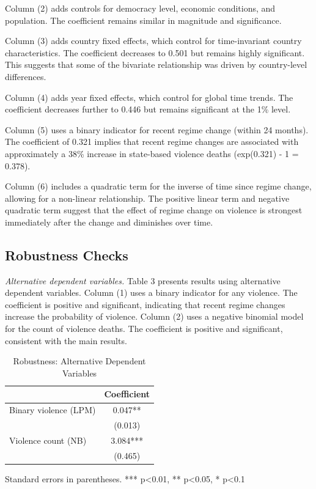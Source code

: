 \documentclass[12pt]{article}
\begin{document}
Column (2) adds controls for democracy level, economic conditions, and population. The coefficient remains similar in magnitude and significance.

Column (3) adds country fixed effects, which control for time-invariant country characteristics. The coefficient decreases to 0.501 but remains highly significant. This suggests that some of the bivariate relationship was driven by country-level differences.

Column (4) adds year fixed effects, which control for global time trends. The coefficient decreases further to 0.446 but remains significant at the 1\% level.

Column (5) uses a binary indicator for recent regime change (within 24 months). The coefficient of 0.321 implies that recent regime changes are associated with approximately a 38\% increase in state-based violence deaths (exp(0.321) - 1 = 0.378).

Column (6) includes a quadratic term for the inverse of time since regime change, allowing for a non-linear relationship. The positive linear term and negative quadratic term suggest that the effect of regime change on violence is strongest immediately after the change and diminishes over time.

\subsection{Robustness Checks}

\textit{Alternative dependent variables.} Table 3 presents results using alternative dependent variables. Column (1) uses a binary indicator for any violence. The coefficient is positive and significant, indicating that recent regime changes increase the probability of violence. Column (2) uses a negative binomial model for the count of violence deaths. The coefficient is positive and significant, consistent with the main results.

\begin{table}[h]
\centering
\caption{Robustness: Alternative Dependent Variables}
\label{tab:robust1}
\begin{tabular}{lc}
\toprule
 & Coefficient \\
\midrule
Binary violence (LPM) & 0.047** \\
 & (0.013) \\
Violence count (NB) & 3.084*** \\
 & (0.465) \\
\bottomrule
\end{tabular}
\vspace{2mm}
\small{Standard errors in parentheses. *** p<0.01, ** p<0.05, * p<0.1}
\end{table}
\end{document}
